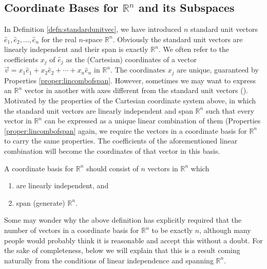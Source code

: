\subsection{Coordinate Bases for $\mathbb{R}^n$ and its Subspaces}
\label{section:6.1.5}
In Definition \ref{defn:standardunitvec}, we have introduced $n$ standard unit vectors $\hat{e}_1, \hat{e}_2, \ldots, \hat{e}_n$ for the real $n$-space $\mathbb{R}^n$. Obviously the standard unit vectors are linearly independent and their span is exactly $\mathbb{R}^n$. We often refer to the coefficients $x_j$ of $\hat{e}_j$ as the (Cartesian) coordinates of a vector $\vec{v} = x_1\hat{e}_1 + x_2\hat{e}_2 + \cdots + x_n\hat{e}_n$ in $\mathbb{R}^n$. The coordinates $x_j$ are unique, guaranteed by Properties \ref{proper:lincombofspan}. However, sometimes we may want to express an $\mathbb{R}^n$ vector in another  with axes different from the standard unit vectors (). Motivated by the properties of the Cartesian coordinate system above, in which the standard unit vectors are linearly independent and span $\mathbb{R}^n$ such that every vector in $\mathbb{R}^n$ can be expressed as a unique linear combination of them (Properties \ref{proper:lincombofspan} again, we require the vectors in a coordinate basis for $\mathbb{R}^n$ to carry the same properties. The coefficients of the aforementioned linear combination will become the coordinates of that vector in this basis.
\begin{defn}
\label{defn:coordRn}
A coordinate basis for $\mathbb{R}^n$ should consist of $n$ vectors in $\mathbb{R}^n$ which
\begin{enumerate}[label=(\alph*)]
\item are linearly independent, and
\item span (generate) $\mathbb{R}^n$.
\end{enumerate}
\end{defn}
Some may wonder why the above definition has explicitly required that the number of vectors in a coordinate basis for $\mathbb{R}^n$ to be exactly $n$, although many people would probably think it is reasonable and accept this without a doubt. For the sake of completeness, below we will explain that this is a result coming naturally from the conditions of linear independence and spanning $\mathbb{R}^n$.
